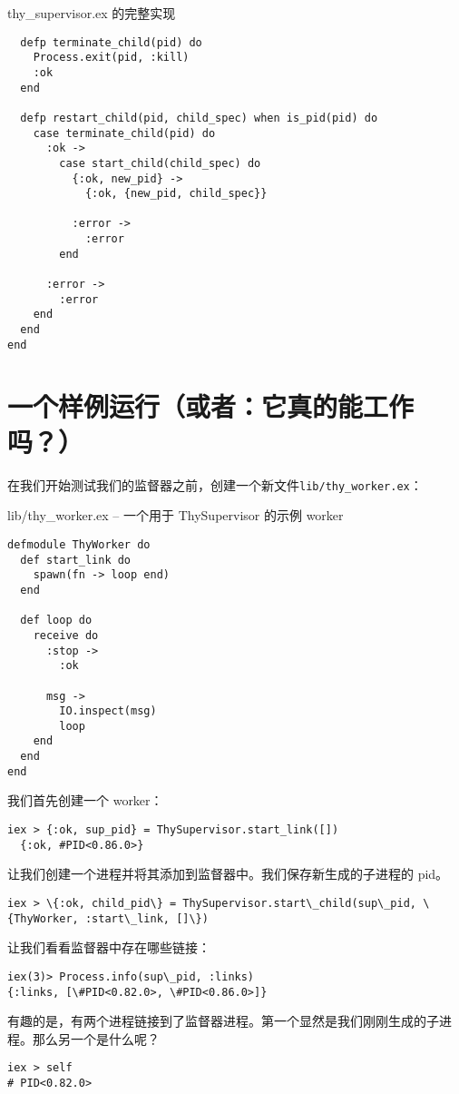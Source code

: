 \begin{code}{thy\_supervisor.ex 的完整实现}
\begin{verbatim}
  defp terminate_child(pid) do
    Process.exit(pid, :kill)
    :ok
  end

  defp restart_child(pid, child_spec) when is_pid(pid) do
    case terminate_child(pid) do
      :ok ->
        case start_child(child_spec) do
          {:ok, new_pid} ->
            {:ok, {new_pid, child_spec}}

          :error ->
            :error
        end

      :error ->
        :error
    end
  end
end
\end{verbatim}
\label{lst:thy_supervisor_complete}
\end{code}

\section{一个样例运行（或者：它真的能工作吗？）}

在我们开始测试我们的监督器之前，创建一个新文件\texttt{lib/thy\_worker.ex}：

\begin{code}{lib/thy\_worker.ex -- 一个用于 ThySupervisor 的示例 worker}
\label{lst:thy_worker_for_demo}
\begin{verbatim}
defmodule ThyWorker do
  def start_link do
    spawn(fn -> loop end)
  end

  def loop do
    receive do
      :stop ->
        :ok

      msg ->
        IO.inspect(msg)
        loop
    end
  end
end
\end{verbatim}
\end{code}

我们首先创建一个 worker：
\begin{verbatim}
iex > {:ok, sup_pid} = ThySupervisor.start_link([])
  {:ok, #PID<0.86.0>}
\end{verbatim}


让我们创建一个进程并将其添加到监督器中。我们保存新生成的子进程的 pid。
\begin{verbatim}
iex > \{:ok, child_pid\} = ThySupervisor.start\_child(sup\_pid, \{ThyWorker, :start\_link, []\})
\end{verbatim}

让我们看看监督器中存在哪些链接：
\begin{verbatim}
iex(3)> Process.info(sup\_pid, :links)
{:links, [\#PID<0.82.0>, \#PID<0.86.0>]}
\end{verbatim}

有趣的是，有两个进程链接到了监督器进程。第一个显然是我们刚刚生成的子进程。那么另一个是什么呢？
\begin{verbatim}
iex > self
# PID<0.82.0>
\end{verbatim}

